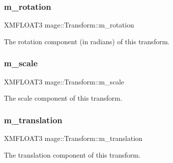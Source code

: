 \subsubsection{\texorpdfstring{m\+\_\+rotation}{m\_rotation}}
{\footnotesize\ttfamily X\+M\+F\+L\+O\+A\+T3 mage\+::\+Transform\+::m\+\_\+rotation\hspace{0.3cm}{\ttfamily [private]}}

The rotation component (in radians) of this transform. \hypertarget{classmage_1_1_transform_a25d15c85b93037bab5b755c86bef0b54}{}\label{classmage_1_1_transform_a25d15c85b93037bab5b755c86bef0b54} 
\subsubsection{\texorpdfstring{m\+\_\+scale}{m\_scale}}
{\footnotesize\ttfamily X\+M\+F\+L\+O\+A\+T3 mage\+::\+Transform\+::m\+\_\+scale\hspace{0.3cm}{\ttfamily [private]}}

The scale component of this transform. \hypertarget{classmage_1_1_transform_a57e27b28e0cf85be034055a68513ad79}{}\label{classmage_1_1_transform_a57e27b28e0cf85be034055a68513ad79} 
\subsubsection{\texorpdfstring{m\+\_\+translation}{m\_translation}}
{\footnotesize\ttfamily X\+M\+F\+L\+O\+A\+T3 mage\+::\+Transform\+::m\+\_\+translation\hspace{0.3cm}{\ttfamily [private]}}

The translation component of this transform. 